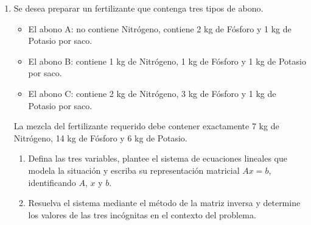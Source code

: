 \documentclass[11pt,a4paper]{article}
\begin{document}
\begin{enumerate}
La suma de las tres tensiones debe soportar el peso total
de la placa que es de 6 kN.

Por equilibrio de momentos respecto al borde $x$,
la tensión $T_2$ aporta el doble que $T_3$ y $T_1$
no aporta momento; el momento total requerido respecto
al borde $x$ es de 7 kNm.

Por equilibrio de momentos respecto a $y$,
$T_1$ aporta 1 vez, $T_2$ aporta 2 veces y
$T_3$ aporta 2 veces; el momento total requerido
respecto a $y$ es de 10 kNm.




\begin{enumerate}
\item Defina las tres variables, plantee el sistema de ecuaciones lineales que modela la situación y escriba su representación matricial $Ax=b$, identificando $A$, $x$ y $b$.
\item Resuelva el sistema mediante la regla de Cramer y determine los valores de las tres incógnitas en el contexto del problema.
\end{enumerate}

\item Se desea preparar un fertilizante que contenga
tres tipos de abono.

\begin{itemize}
\item El abono A: no contiene Nitrógeno,
contiene 2 kg de Fósforo y 1 kg de Potasio por saco.

\item El abono B: contiene 1 kg de Nitrógeno,
1 kg de Fósforo y 1 kg de Potasio por saco.

\item El abono C: contiene 2 kg de Nitrógeno,
3 kg de Fósforo y 1 kg de Potasio por saco.
\end{itemize}

La mezcla del fertilizante requerido debe contener
exactamente 7 kg de Nitrógeno, 14 kg de Fósforo
y 6 kg de Potasio.




\begin{enumerate}
\item Defina las tres variables, plantee el sistema de ecuaciones lineales que modela la situación y escriba su representación matricial $Ax=b$, identificando $A$, $x$ y $b$.
\item Resuelva el sistema mediante el método de la matriz inversa y determine los valores de las tres incógnitas en el contexto del problema.
\end{enumerate}

\end{enumerate}

\end{document}
